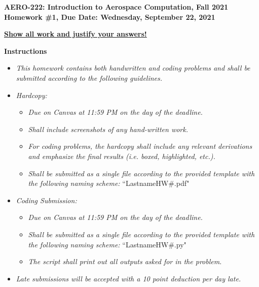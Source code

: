 \documentclass[12pt]{article}
\begin{document}
\newif\ifsolution    %


\begin{center}{\bf AERO-222: Introduction to Aerospace Computation, Fall 2021\\ Homework \#1, Due Date: Wednesday, September 22, 2021} \vspace{0.5cm}

\textbf{\underline{Show all work and justify your answers!}} \vspace{0.5cm}
\end{center}

{\Large \textbf{Instructions}}

\begin{itemize}
	\item \textit{This homework contains both handwritten and coding problems and shall be submitted according to the following guidelines.}
	\item \textit{Hardcopy:}
	\begin{itemize}
	    \item \textit{Due on Canvas at 11:59 PM on the day of the deadline.}
	    \item \textit{Shall include screenshots of any hand-written work.}
	    \item \textit{For coding problems, the hardcopy shall include any relevant derivations and emphasize the final results (i.e. boxed, highlighted, etc.).}
	    \item \textit{Shall be submitted as a single file according to the provided template with the following naming scheme:} ``LastnameHW\#.pdf"
	\end{itemize}
	\item \textit{Coding Submission:}
	\begin{itemize}
	    \item \textit{Due on Canvas at 11:59 PM on the day of the deadline.}
	    \item \textit{Shall be submitted as a single file according to the provided template with the following naming scheme:} ``LastnameHW\#.py"
	    \item \textit{The script shall print out all outputs asked for in the problem}.
	\end{itemize}
    \item \textit{Late submissions will be accepted with a 10 point deduction per day late.}
\end{itemize}
\hrulefill
\end{document}
